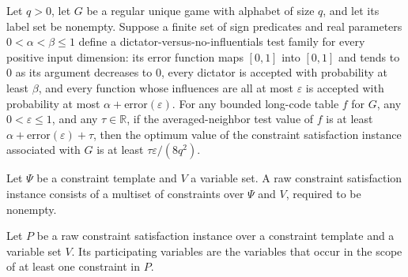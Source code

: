 \begin{theorem}
\label{FABL.RegularUniqueGame.excess_mul_epsilon_div_eight_mul_q_sq_le_optimum_of_noInfluentials}
\leanok
{}
Let $q>0$, let $G$ be a regular unique game with alphabet of size $q$, and let its label
set be nonempty. Suppose a finite set of sign predicates and real parameters
$0<\alpha<\beta\le 1$ define a dictator-versus-no-influentials test family for every
positive input dimension: its error function maps $[0,1]$ into $[0,1]$ and tends to $0$
as its argument decreases to $0$, every dictator is accepted with probability at least
$\beta$, and every function whose influences are all at most $\varepsilon$ is accepted
with probability at most $\alpha+\mathrm{error}(\varepsilon)$. For any bounded long-code
table $f$ for $G$, any $0<\varepsilon\le 1$, and any $\tau\in\mathbb R$, if the
averaged-neighbor test value of $f$ is at least
$\alpha+\mathrm{error}(\varepsilon)+\tau$, then the optimum value of the constraint
satisfaction instance associated with $G$ is at least $\tau\varepsilon/(8q^2)$.
\end{theorem}

\begin{definition}
\label{FABL.RawCSPInstance}
\leanok
{}
Let $\Psi$ be a constraint template and $V$ a variable set. A raw constraint
satisfaction instance consists of a multiset of constraints over $\Psi$ and $V$,
required to be nonempty.
\end{definition}

\begin{definition}
\label{FABL.RawCSPInstance.ParticipatingVariable}
\leanok
Let $P$ be a raw constraint satisfaction instance over a constraint template and a
variable set $V$. Its participating variables are the variables that occur in the scope
of at least one constraint in $P$.
\end{definition}

